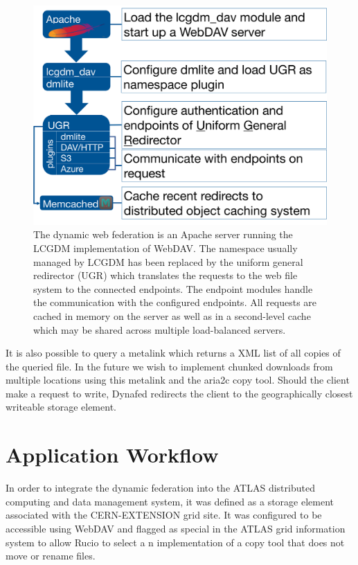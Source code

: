 \documentclass[a4paper]{jpconf}
\begin{document}
\begin{figure}
  \centering
  \includegraphics[width=\textwidth]{dynafed-arch.png}
  \caption{The dynamic web federation is an Apache server running the LCGDM implementation of WebDAV. The namespace usually managed by LCGDM has been replaced by the uniform general redirector (UGR) which translates the requests to the web file system to the connected endpoints. The endpoint modules handle the communication with the configured endpoints. All requests are cached in memory on the server as well as in a second-level cache which may be shared across multiple load-balanced servers.}
  \label{fig:dynafed-arch}
\end{figure}

 It is also possible to query a metalink which returns a XML list of all copies of the queried file. In the future we wish to implement chunked downloads from multiple locations using this metalink and the aria2c copy tool. Should the client make a request to write, Dynafed redirects the client to the geographically closest writeable storage element.


\section{Application Workflow}
In order to integrate the dynamic federation into the ATLAS distributed computing and data management system, it was defined as a storage element associated with the \textrm{CERN-EXTENSION} grid site. It was configured to be accessible using WebDAV and flagged as special in the ATLAS grid information system to allow Rucio to select a n implementation of a copy tool that does not move or rename files.
\end{document}
